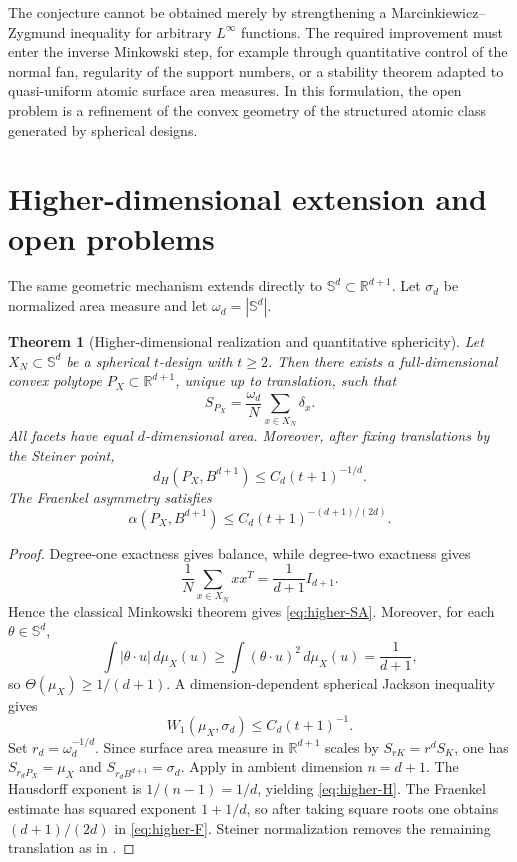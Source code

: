 \documentclass[11pt]{article}
\newtheorem{theorem}{Theorem}[section]
\theoremstyle{definition}
\theoremstyle{remark}
\newcommand{\Sph}{\mathbb S}
\newcommand{\R}{\mathbb R}
\begin{document}
The conjecture cannot be obtained merely by strengthening a Marcinkiewicz--Zygmund inequality for arbitrary $L^\infty$ functions. The required improvement must enter the inverse Minkowski step, for example through quantitative control of the normal fan, regularity of the support numbers, or a stability theorem adapted to quasi-uniform atomic surface area measures. In this formulation, the open problem is a refinement of the convex geometry of the structured atomic class generated by spherical designs.

\section{Higher-dimensional extension and open problems}\label{sec:higher}

The same geometric mechanism extends directly to $\Sph^d\subset\R^{d+1}$. Let $\sigma_d$ be normalized area measure and let $\omega_d=|\Sph^d|$.

\begin{theorem}[Higher-dimensional realization and quantitative sphericity]\label{thm:higher}
Let $X_N\subset\Sph^d$ be a spherical $t$-design with $t\ge2$. Then there exists a full-dimensional convex polytope $P_X\subset\R^{d+1}$, unique up to translation, such that
\begin{equation}\label{eq:higher-SA}
S_{P_X}=\frac{\omega_d}{N}\sum_{x\in X_N}\delta_x.
\end{equation}
All facets have equal $d$-dimensional area. Moreover, after fixing translations by the Steiner point,
\begin{equation}\label{eq:higher-H}
d_H(P_X,B^{d+1})\le C_d(t+1)^{-1/d}.
\end{equation}
The Fraenkel asymmetry satisfies
\begin{equation}\label{eq:higher-F}
\alpha(P_X,B^{d+1})\le C_d(t+1)^{-(d+1)/(2d)}.
\end{equation}
\end{theorem}

\begin{proof}
Degree-one exactness gives balance, while degree-two exactness gives
\begin{equation}\label{eq:higher-second}
\frac1N\sum_{x\in X_N}xx^T=\frac1{d+1}I_{d+1}.
\end{equation}
Hence the classical Minkowski theorem gives \eqref{eq:higher-SA}. Moreover, for each $\theta\in\Sph^d$,
\[
\int|\theta\cdot u|\,d\mu_X(u)
\ge\int(\theta\cdot u)^2\,d\mu_X(u)
=\frac1{d+1},
\]
so $\Theta(\mu_X)\ge1/(d+1)$. A dimension-dependent spherical Jackson inequality gives
\[
W_1(\mu_X,\sigma_d)\le C_d(t+1)^{-1}.
\]
Set $r_d=\omega_d^{-1/d}$. Since surface area measure in $\R^{d+1}$ scales by $S_{rK}=r^dS_K$, one has $S_{r_dP_X}=\mu_X$ and $S_{r_dB^{d+1}}=\sigma_d$. Apply  in ambient dimension $n=d+1$. The Hausdorff exponent is $1/(n-1)=1/d$, yielding \eqref{eq:higher-H}. The Fraenkel estimate has squared exponent $1+1/d$, so after taking square roots one obtains $(d+1)/(2d)$ in \eqref{eq:higher-F}. Steiner normalization removes the remaining translation as in .
\end{proof}
\end{document}
